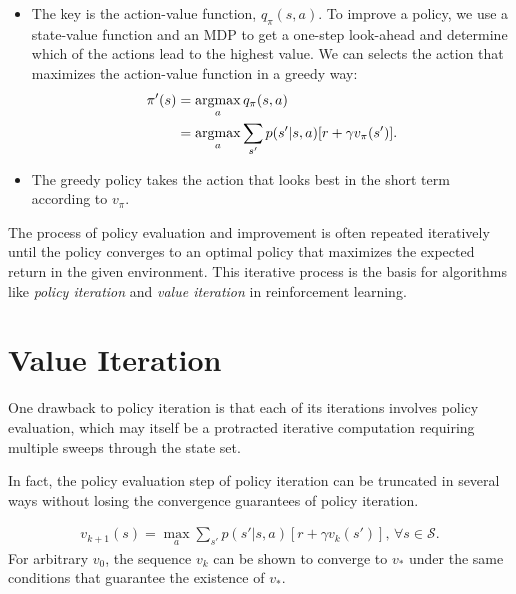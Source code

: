 \begin{itemize}
	\item The key is the action-value function, $q_\pi(s,a)$. To improve a policy, we use a state-value function and an MDP to get a one-step look-ahead and determine which of the actions lead to the highest value. We can selects the action that maximizes the action-value function in a greedy way: 
		\begin{align*}
			\pi'(s) &= \operatorname*{\operatorname{argmax}}_a q_\pi(s,a)\\
			&= \operatorname*{\operatorname{argmax}}_a \sum_{s'}p(s'|s,a)[r + \gamma v_\pi(s')].
		\end{align*}
	\item The greedy policy takes the action that looks best in the short term according to $v_\pi$.
\end{itemize}

The process of policy evaluation and improvement is often repeated iteratively until the policy converges to an optimal policy that maximizes the expected return in the given environment. This iterative process is the basis for algorithms like \textit{policy iteration} and \textit{value iteration} in reinforcement learning.


\section{Value Iteration}
One drawback to policy iteration is that each of its iterations involves policy evaluation, which may itself be a protracted iterative computation requiring multiple sweeps through the state set.

In fact, the policy evaluation step of policy iteration can be truncated in several ways without losing the convergence guarantees of policy iteration.

\begin{align}
	v_{k+1}(s)=\max_a \sum_{s'}p(s'|s,a)[r + \gamma v_k(s')], \, \forall s\in \mathcal{S}.
	\label{eq:value_iteration}
\end{align}
For arbitrary $v_0$, the sequence $v_k$ can be shown to converge to $v_*$ under the same conditions that guarantee the existence of $v_*$.

